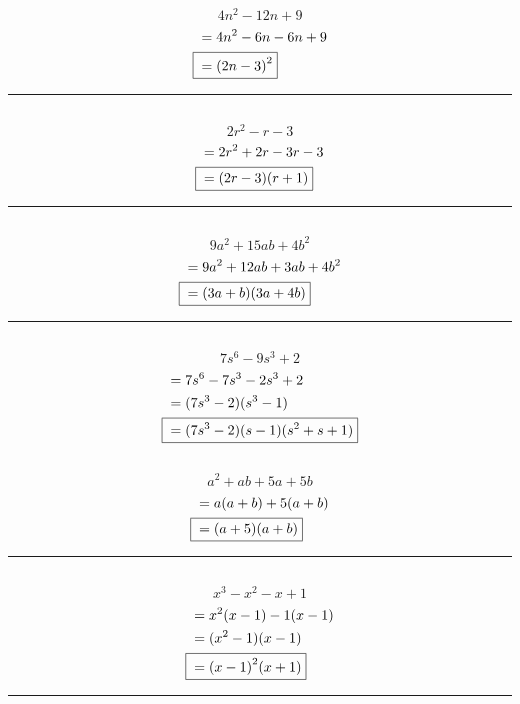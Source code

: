 	\subsection{}
		\[4n^2 - 12n + 9\]
		\begin{align*}
			&= 4n^2 - 6n - 6n + 9 \\
			\Aboxed{{} &= {(2n - 3)}^2}
		\end{align*}
		\hrule{}

	\subsection{}
		\[2r^2 - r - 3\]
		\begin{align*}
			&= 2r^2 + 2r - 3r - 3 \\
			\Aboxed{{} &= (2r - 3)(r + 1)}
		\end{align*}
		\hrule{}

	\subsection{}
		\[9a^2 + 15ab + 4b^2\]
		\begin{align*}
			&= 9a^2 + 12ab + 3ab + 4b^2 \\
			\Aboxed{{} &= (3a + b)(3a + 4b)}
		\end{align*}
		\hrule{}

	\subsection{}
		\[7s^6 - 9s^3 + 2\]
		\begin{align*}
			&= 7s^6 - 7s^3 - 2s^3 + 2 \\
			&= (7s^3 - 2)(s^3 - 1) \\
			\Aboxed{{} &= (7s^3 - 2)(s - 1)(s^2 + s + 1)}
		\end{align*}

	\subsection{}
		\[a^2 + ab + 5a + 5b\]
		\begin{align*}
			&= a(a + b) + 5(a + b) \\
			\Aboxed{{} &= (a + 5)(a + b)}
		\end{align*}
		\hrule{}

	\subsection{}
		\[x^3 - x^2 - x + 1\]
		\begin{align*}
			&= x^2(x - 1) - 1(x - 1) \\
			&= (x^2 - 1)(x - 1) \\
			\Aboxed{{} &= {(x - 1)}^2(x + 1)}
		\end{align*}
		\hrule{}

